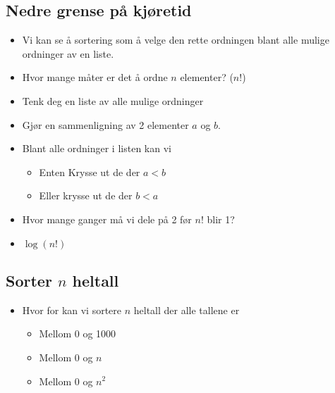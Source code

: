 \documentclass{article}
\begin{document}
    \subsection{Nedre grense på kjøretid}
    \begin{itemize}
        \item Vi kan se å sortering som å velge den rette ordningen blant alle mulige ordninger av en liste.
        \item Hvor mange måter er det å ordne \( n \) elementer? (\( n! \))
        \item Tenk deg en liste av alle mulige ordninger
        \item Gjør en sammenligning av 2 elementer \( a \) og \( b \).
        \item Blant alle ordninger i listen kan vi
        \begin{itemize}
            \item Enten Krysse ut de der \( a < b \)
            \item Eller krysse ut de der \( b < a \)
        \end{itemize}

        \item Hvor mange ganger må vi dele på 2 før \( n! \) blir 1?
            \item \( \log\left( n! \right) \)
    \end{itemize}

    \subsection{Sorter \( n \) heltall}
    \begin{itemize}
        \item Hvor for kan vi sortere \( n \) heltall der alle tallene er
            \begin{itemize}
                \item Mellom 0 og 1000
                \item Mellom 0 og \( n \)
                \item Mellom 0 og \( n^2 \)
            \end{itemize}
    \end{itemize}
\end{document}
